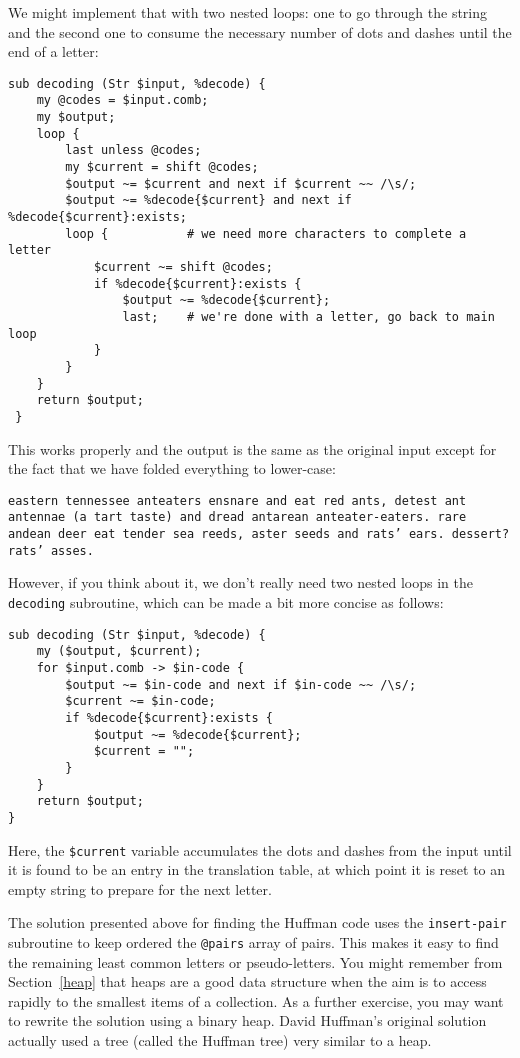 {We might implement that with two nested loops: one to go through the 
string and the second one to consume the necessary number of dots and 
dashes until the end of a letter:

\begin{verbatim}
sub decoding (Str $input, %decode) {
    my @codes = $input.comb;
    my $output;
    loop {
        last unless @codes;
        my $current = shift @codes;
        $output ~= $current and next if $current ~~ /\s/;
        $output ~= %decode{$current} and next if %decode{$current}:exists;
        loop {           # we need more characters to complete a letter
            $current ~= shift @codes;
            if %decode{$current}:exists {
                $output ~= %decode{$current};
                last;    # we're done with a letter, go back to main loop
            }
        }
    }
    return $output;
 }
\end{verbatim}

This works properly and the output is the same as the original 
input except for the fact that we have folded everything to 
lower-case:

\begin{verbatim}
eastern tennessee anteaters ensnare and eat red ants, detest ant
antennae (a tart taste) and dread antarean anteater-eaters. rare
andean deer eat tender sea reeds, aster seeds and rats’ ears. dessert?
rats’ asses.
\end{verbatim}

However, if you think about it, we don't really need two 
nested loops in the {\tt decoding} subroutine, which can be 
made a bit more concise as follows:

\begin{verbatim}
sub decoding (Str $input, %decode) {
    my ($output, $current);
    for $input.comb -> $in-code {
        $output ~= $in-code and next if $in-code ~~ /\s/;
        $current ~= $in-code;
        if %decode{$current}:exists {
            $output ~= %decode{$current};
            $current = "";
        }
    }
    return $output;
}
\end{verbatim}

Here, the \verb'$current' variable accumulates the dots and 
dashes from the input until it is found to be an entry in 
the translation table, at which point it is reset to an 
empty string to prepare for the next letter.

The solution presented above for finding the Huffman code 
uses the {\tt insert-pair} subroutine to keep ordered the 
\verb'@pairs' array of pairs. This makes it easy to find the remaining 
least common letters or pseudo-letters. You might remember 
from Section~\ref{heap} that heaps are a good data structure 
when the aim is to access rapidly to the smallest items 
of a collection. As a further exercise, you may want to 
rewrite the solution using a binary heap. David Huffman's original 
solution actually used a tree (called the Huffman tree) very 
similar to a heap.


}
